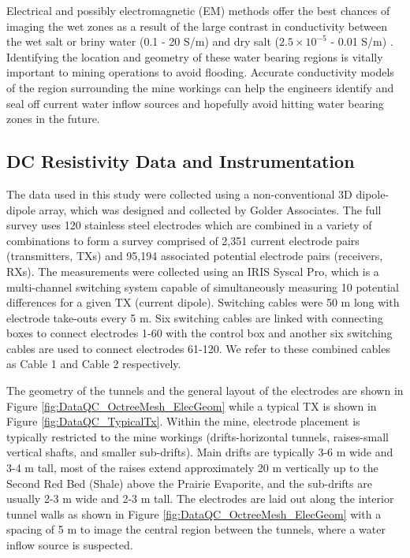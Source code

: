 \documentclass[final,authoryear,5p,times,twocolumn]{elsarticle}
\begin{document}
Electrical and possibly electromagnetic (EM) methods offer the best chances of imaging the wet zones as a result of the large contrast in conductivity between the wet salt or briny water (0.1 - 20 S/m) and dry salt ($2.5 \times 10^{-5}$ - 0.01 S/m) \citep{Duckworth1992, Chouteau1997}. Identifying the location and geometry of these water bearing regions is vitally important to mining operations to avoid flooding. Accurate conductivity models of the region surrounding the mine workings can help the engineers identify and seal off current water inflow sources and hopefully avoid hitting water bearing zones in the future. 

\subsection{DC Resistivity Data and Instrumentation}
\label{CaseStudy:Data_Instrumentation}
The data used in this study were collected using a non-conventional 3D dipole-dipole array, which was designed and collected by Golder Associates. The full survey uses 120 stainless steel electrodes which are combined in a variety of combinations to form a survey comprised of 2,351 current electrode pairs (transmitters, TXs) and 95,194 associated potential electrode pairs (receivers, RXs). The measurements were collected using an IRIS Syscal Pro, which is a multi-channel switching system capable of simultaneously measuring 10 potential differences for a given TX (current dipole). Switching cables were 50 m long with electrode take-outs every 5 m. Six switching cables are linked with connecting boxes to connect electrodes 1-60 with the control box and another six switching cables are used to connect electrodes 61-120. We refer to these combined cables as Cable 1 and Cable 2 respectively. 

The geometry of the tunnels and the general layout of the electrodes are shown in Figure \ref{fig:DataQC_OctreeMesh_ElecGeom} while a typical TX is shown in Figure \ref{fig:DataQC_TypicalTx}. Within the mine, electrode placement is typically restricted to the mine workings (drifts-horizontal tunnels, raises-small vertical shafts, and smaller sub-drifts). Main drifts are typically 3-6 m wide and 3-4 m tall, most of the raises extend approximately 20 m vertically up to the Second Red Bed (Shale) above the Prairie Evaporite, and the sub-drifts are usually 2-3 m wide and 2-3 m tall. The electrodes are laid out along the interior tunnel walls as shown in Figure \ref{fig:DataQC_OctreeMesh_ElecGeom} with a spacing of 5 m to image the central region between the tunnels, where a water inflow source is suspected.
\end{document}
